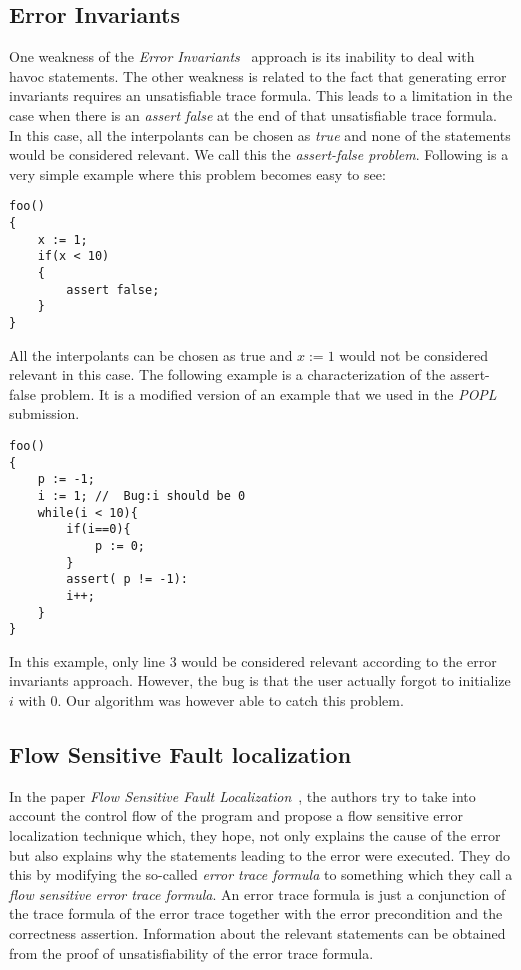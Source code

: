 \documentclass{article}
\begin{document}
\subsection{Error Invariants}
One weakness of the \textit{Error Invariants}~\cite{fm/ErmisSW12} approach is its inability to deal with havoc statements. The other weakness is related to the fact that generating error invariants requires an unsatisfiable trace formula. This leads to a limitation in the case when there is an \textit{assert false} at the end of that unsatisfiable trace formula. In this case, all the interpolants can be chosen as \textit{true} and none of the statements would be considered relevant. We call this the \textit{assert-false problem}. Following is a very simple example where this problem becomes easy to see:
\begin{lstlisting}
foo()
{ 
	x := 1;
	if(x < 10)
	{
		assert false;	
	}	
}
\end{lstlisting}
All the interpolants can be chosen as true and $x:=1$ would not be considered relevant in this case. The following example is a characterization of the assert-false problem. It is a modified version of an example that we used in the \textit{POPL} submission.
\begin{lstlisting}
foo()
{ 
	p := -1;
	i := 1; //  Bug:i should be 0
	while(i < 10){
		if(i==0){
			p := 0;		
		}
		assert( p != -1):
		i++;	
	}
}
\end{lstlisting}
In this example, only line 3 would be considered relevant according to the error invariants approach. However, the bug is that the user actually forgot to initialize $i$ with 0. Our algorithm was however able to catch this problem.

\subsection{Flow Sensitive Fault localization} 
In the paper \textit{Flow Sensitive Fault Localization}~\cite{vmcai/ChristESW13}, the authors try to take into account the control flow of the program and propose a flow sensitive error localization technique which, they hope, not only explains the cause of the error but also explains why the statements leading to the error were executed. They do this by modifying the so-called \textit{error trace formula} to something which they call a \textit{flow sensitive error trace formula}. An error trace formula is just a conjunction of the trace formula of the error trace together with the error precondition and the correctness assertion. Information about the relevant statements can be obtained from the proof of unsatisfiability of the error trace formula.
\end{document}
